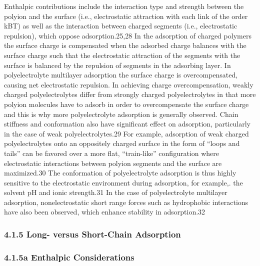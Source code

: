 \documentclass[journal=jacsat,manuscript=article]{achemso}
\begin{document}
Enthalpic contributions include the interaction type and strength between the polyion and the surface (i.e., electrostatic attraction with each link of the order kBT) as well as the interaction between charged segments (i.e., electrostatic repulsion), which oppose adsorption.25,28  In the adsorption of charged polymers the surface charge is compensated when the adsorbed charge balances with the surface charge such that the electrostatic attraction of the segments with the surface is balanced by the repulsion of segments in the adsorbing layer.  In polyelectrolyte multilayer adsorption the surface charge is overcompensated, causing net electrostatic repulsion.  In achieving charge overcompensation, weakly charged polyelectrolytes differ from strongly charged polyelectrolytes in that more polyion molecules have to adsorb in order to overcompensate the surface charge and this is why more polyelectrolyte adsorption is generally observed.  Chain stiffness and conformation also have significant effect on adsorption, particularly in the case of weak polyelectrolytes.29  For example, adsorption of weak charged polyelectrolytes onto an oppositely charged surface in the form of “loops and tails” can be favored over a more flat, “train-like” configuration where electrostatic interactions between polyion segments and the surface are maximized.30  The conformation of polyelectrolyte adsorption is thus highly sensitive to the electrostatic environment during adsorption, for example,. the solvent pH and ionic strength.31  In the case of polyelectrolyte multilayer adsorption, nonelectrostatic short range forces such as hydrophobic interactions have also been observed, which enhance stability in adsorption.32  


\subsubsection{4.1.5 Long- versus Short-Chain Adsorption }

\subsubsection{4.1.5a Enthalpic Considerations}
\end{document}
